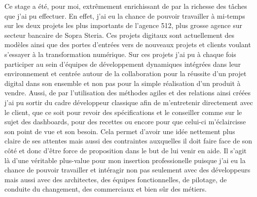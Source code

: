 \newenvironment{changemargin}[2]{%
\begin{list}{}{%
\setlength{\topsep}{0pt}%
\setlength{\leftmargin}{#1}%
\setlength{\rightmargin}{#2}%
\setlength{\listparindent}{\parindent}%
\setlength{\itemindent}{\parindent}%
\setlength{\parsep}{\parskip}%
}%
\item[]}{\end{list}}

\begin{changemargin}{-1cm}{-1cm}

	Ce stage a été, pour moi, extrêmement enrichissant de par la richesse des tâches que j'ai pu effectuer. En effet, j'ai eu la chance de pouvoir travailler à mi-temps sur les deux projets les plus importants de l'agence 512, plus grosse agence sur secteur bancaire de Sopra Steria. Ces projets digitaux sont actuellement des modèles ainsi que des portes d'entrées vers de nouveaux projets et clients voulant s'essayer à la transformation numérique. Sur ces projets j'ai pu à chaque fois participer au sein d'équipes de développement dynamiques intégrées dans leur environnement et centrée autour de la collaboration pour la réussite d'un projet digital dans son ensemble et non pas pour la simple réalisation d'un produit à vendre. Aussi, de par l'utilisation des méthodes agiles et des relations ainsi créées j'ai pu sortir du cadre développeur classique afin de m'entretenir directement avec le client, que ce soit pour revoir des spécifications et le conseiller comme sur le sujet des dashboards, pour des recettes ou encore pour que celui-ci m'éclaircisse son point de vue et son besoin. Cela permet d'avoir une idée nettement plus claire de ses attentes mais aussi des contraintes auxquelles il doit faire face de son côté et donc d'être force de proposition dans le but de lui venir en aide. Il s'agit là d'une véritable plus-value pour mon insertion professionelle puisque j'ai eu la chance de pouvoir travailler et intéragir non pas seulement avec des développeurs mais aussi avec des architectes, des équipes fonctionnelles, de pilotage, de conduite du changement, des commerciaux et bien sûr des métiers. \\
	

\end{changemargin}
